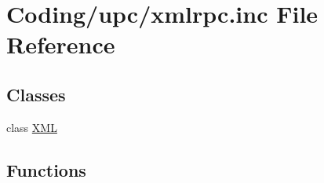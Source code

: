 \hypertarget{xmlrpc_8inc}{
\section{Coding/upc/xmlrpc.inc File Reference}
\label{xmlrpc_8inc}
}
\subsection*{Classes}
\begin{CompactItemize}
\item 
class \hyperlink{classXML}{XML}
\end{CompactItemize}
\subsection*{Functions}

